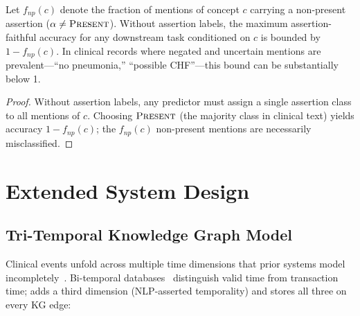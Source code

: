 \begin{corollary}
\label{cor:faithfulness}
Let $f_{\textit{np}}(c)$ denote the fraction of mentions of concept $c$ carrying a non-present assertion ($\alpha \neq \textsc{Present}$).
Without assertion labels, the maximum assertion-faithful accuracy for any downstream task conditioned on $c$ is bounded by $1 - f_{\textit{np}}(c)$.
In clinical records where negated and uncertain mentions are prevalent---\eg ``no pneumonia,'' ``possible CHF''---this bound can be substantially below 1.
\end{corollary}

\begin{proof}
Without assertion labels, any predictor must assign a single assertion class to all mentions of $c$.
Choosing $\textsc{Present}$ (the majority class in clinical text) yields accuracy $1 - f_{\textit{np}}(c)$; the $f_{\textit{np}}(c)$ non-present mentions are necessarily misclassified.
\end{proof}


\section{Extended System Design}
\label{app:system_extended}

\subsection{Tri-Temporal Knowledge Graph Model}
\label{app:temporal_model}

Clinical events unfold across multiple time dimensions that prior systems model incompletely~\cite{huang2024medtkg,ramirez2025graphiti}.
Bi-temporal databases~\cite{snodgrass2000temporal} distinguish valid time from transaction time; \epikg adds a third dimension (NLP-asserted temporality) and stores all three on every KG edge:

